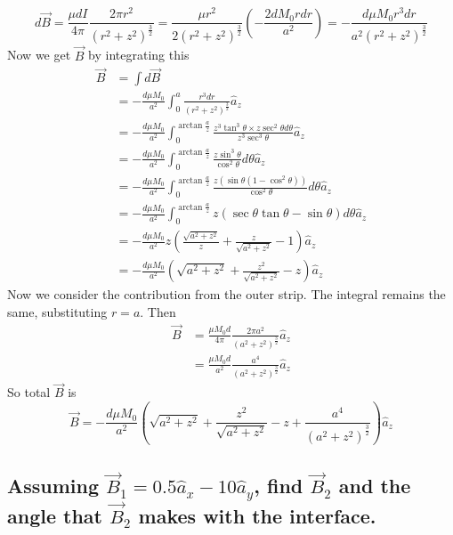 \documentclass[answers]{exam}
\begin{document}
\begin{questions}
\begin{solution}
    $$d\vec B = \frac{\mu dI}{4\pi} \frac{2\pi r^2}{(r^2+z^2)^{\frac{3}{2}}} = \frac{\mu r^2}{2(r^2+z^2)^{\frac{3}{2}}} \left(-\frac{2dM_0 rdr}{a^2}\right) = -\frac{d\mu M_0r^3dr}{a^2(r^2+z^2)^{\frac{3}{2}}}$$
    Now we get $\vec B$ by integrating this
    \begin{align*}
        \vec B &= \int d\vec B \\
               &= -\frac{d\mu M_0}{a^2} \int_0^a \frac{r^3dr}{(r^2+z^2)^{\frac{3}{2}}} \hat a_z \\
               &= -\frac{d\mu M_0}{a^2} \int_0^{\arctan\frac{a}{z}} \frac{z^3\tan^3\theta\times z\sec^2\theta d\theta}{z^3\sec^3\theta} \hat a_z \\
               &= -\frac{d\mu M_0}{a^2} \int_0^{\arctan\frac{a}{z}} \frac{z\sin^3\theta}{\cos^2\theta}d\theta \hat a_z \\
               &= -\frac{d\mu M_0}{a^2} \int_0^{\arctan\frac{a}{z}} \frac{z(\sin\theta(1-\cos^2\theta))}{\cos^2\theta} d\theta \hat a_z \\
               &= -\frac{d\mu M_0}{a^2} \int_0^{\arctan\frac{a}{z}} z(\sec\theta\tan\theta - \sin\theta) d\theta \hat a_z \\
               &= -\frac{d\mu M_0}{a^2} z\left(\frac{\sqrt{a^2+z^2}}{z} + \frac{z}{\sqrt{a^2+z^2}} - 1\right) \hat a_z \\
               &= -\frac{d\mu M_0}{a^2} \left(\sqrt{a^2+z^2} + \frac{z^2}{\sqrt{a^2+z^2}} - z\right) \hat a_z
    \end{align*}
    Now we consider the contribution from the outer strip. The integral remains the same, substituting $r=a$. Then
    \begin{align*}
        \vec B &= \frac{\mu M_0d}{4\pi} \frac{2\pi a^2}{(a^2+z^2)^{\frac{3}{2}}} \hat a_z \\
               &= \frac{\mu M_0d}{a^2} \frac{a^4}{(a^2+z^2)^{\frac{3}{2}}} \hat a_z
    \end{align*}
    So total $\vec B$ is
    $$\vec B = -\frac{d\mu M_0}{a^2} \left(\sqrt{a^2+z^2} + \frac{z^2}{\sqrt{a^2+z^2}} - z + \frac{a^4}{(a^2+z^2)^{\frac{3}{2}}}\right) \hat a_z$$


\end{solution}


\begin{parts}
    \part{Assuming $\vec B_1 = 0.5\hat a_x - 10\hat a_y$, find $\vec B_2$ and the angle that $\vec B_2$ makes with the interface.}


\end{parts}
\end{questions}
\end{document}
